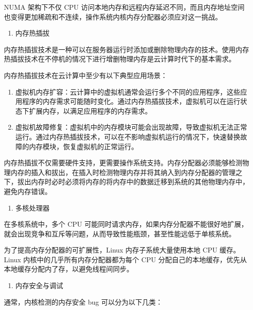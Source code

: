\documentclass[AutoFakeBold]{LZUThesis}
\newcommand{\tightlist}{%
  \setlength{\itemsep}{0pt}\setlength{\parskip}{0pt}}
\begin{document}
\begin{sloppypar}
NUMA 架构下不仅 CPU
访问本地内存和远程内存延迟不同，而且内存地址空间也变得更加稀疏和不连续，操作系统内核内存分配器必须应对这一挑战。

\begin{enumerate}
\def\labelenumi{\arabic{enumi}.}
\setcounter{enumi}{1}
\tightlist
\item
  内存热插拔
\end{enumerate}

内存热插拔技术是一种可以在服务器运行时添加或删除物理内存的技术。使用内存热插拔技术在不停机的情况下进行增删物理内存是云计算时代下的基本需求。

内存热插拔技术在云计算中至少有以下典型应用场景：

\begin{enumerate}
\def\labelenumi{\arabic{enumi}.}
\item
  虚拟机内存扩容：云计算中的虚拟机通常会运行多个不同的应用程序，这些应用程序的内存需求可能随时变化。通过内存热插拔技术，虚拟机可以在运行状态下扩展内存，以满足应用程序的内存需求。
\item
  虚拟机故障修复：虚拟机中的内存模块可能会出现故障，导致虚拟机无法正常运行。通过内存热插拔技术，可以在不影响虚拟机运行的情况下，快速替换故障的内存模块，恢复虚拟机的正常运行。
\end{enumerate}

内存热插拔不仅需要硬件支持，更需要操作系统支持。内存分配器必须能够检测物理内存的插入和拔出，在插入时检测物理内存并将其纳入到内存分配器的管理之下，拔出内存时必时必须将内存的将内存中的数据迁移到系统的其他物理内存中，避免内存错误。

\begin{enumerate}
\def\labelenumi{\arabic{enumi}.}
\setcounter{enumi}{2}
\tightlist
\item
  多核处理器
\end{enumerate}

在多核系统中，多个 CPU
可能同时请求内存，如果内存分配器不能很好地扩展，就会出现竞争和互斥等问题，从而导致性能瓶颈，甚至性能远低于单核系统。

为了提高内存分配器的可扩展性，Linux 内存子系统大量使用本地 CPU
缓存。Linux 内核中的几乎所有内存分配器都为每个 CPU
分配自己的本地缓存，优先从本地缓存分配内了存，以避免线程间同步。

\begin{enumerate}
\def\labelenumi{\arabic{enumi}.}
\setcounter{enumi}{3}
\tightlist
\item
  内存安全与调试
\end{enumerate}

通常，内核检测的内存安全 bug 可以分为以下几类：


\end{sloppypar}
\end{document}
